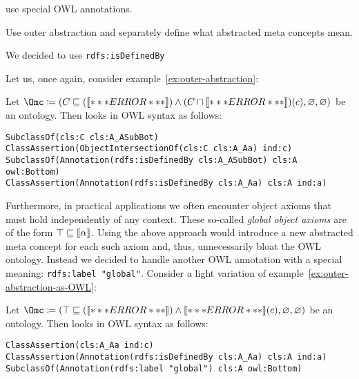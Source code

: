 use special OWL annotations.

Use outer abstraction and separately define what abstracted meta concepts mean.


We decided to use \verb+rdfs:isDefinedBy+

Let us, once again, consider example~\ref{ex:outer-abstraction}:
\begin{example}\label{ex:outer-abstraction-as-OWL}
  Let
  $\Omc \coloneqq (C\sqsubseteq(\oax{A\sqsubseteq\bot}) \land (C\sqcap\oax{A(a)})(c), \emptyset,
  \emptyset)$ be an \ALCALC ontology. Then \Omc looks in OWL syntax as follows:

\begin{verbatim}
SubclassOf(cls:C cls:A_ASubBot)
ClassAssertion(ObjectIntersectionOf(cls:C cls:A_Aa) ind:c)
SubclassOf(Annotation(rdfs:isDefinedBy cls:A_ASubBot) cls:A owl:Bottom)
ClassAssertion(Annotation(rdfs:isDefinedBy cls:A_Aa) cls:A ind:a)
\end{verbatim}

\vspace{-2.0\baselineskip}  
\end{example}

Furthermore, in practical applications we often encounter object axioms that must hold independently
of any context. These so-called \emph{global object axioms} are of the form
$\top \sqsubseteq \llbracket\alpha\rrbracket$. Using the above approach would introduce a new abstracted  meta concept for each such axiom and, thus, unnecessarily bloat the OWL
ontology. Instead we decided to handle another OWL annotation with a special meaning:
\verb+rdfs:label "global"+. Consider a light variation of example~\ref{ex:outer-abstraction-as-OWL}:

\begin{example}\label{ex:outer-abstraction-as-OWL-w-global}
  Let $\Omc \coloneqq (\top\sqsubseteq(\oax{A\sqsubseteq\bot}) \land \oax{A(a)}(c), \emptyset, \emptyset)$ be
  an \ALCALC ontology. Then \Omc looks in OWL syntax as follows:

\begin{verbatim}
ClassAssertion(cls:A_Aa ind:c)
ClassAssertion(Annotation(rdfs:isDefinedBy cls:A_Aa) cls:A ind:a)
SubclassOf(Annotation(rdfs:label "global") cls:A owl:Bottom)
\end{verbatim}

\vspace{-2.0\baselineskip}  
\end{example}

\clearpage

